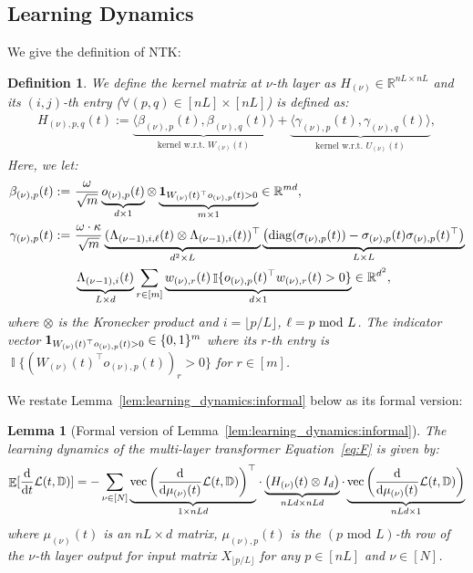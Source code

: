 \documentclass[11pt]{article}
\theoremstyle{plain}
\newtheorem{lemma}[theorem]{Lemma}
\newtheorem{definition}[theorem]{Definition}
\newcommand{\R}{\mathbb{R}}
\renewcommand{\d}{\mathrm{d}}
\DeclareMathOperator*{\E}{{\mathbb{E}}}
\DeclareMathOperator{\I}{\mathbb{I}}
\DeclareMathOperator{\diag}{diag}
\DeclareMathOperator{\vect}{vec}
\begin{document}
\subsection{Learning Dynamics}

We give the definition of NTK:
\begin{definition}
    We define the kernel matrix at $\nu$-th layer as $H_{(\nu)} \in \R^{nL \times nL}$ and its $(i, j)$-th entry ($\forall (p, q) \in [nL] \times [nL]$) is defined as:
\begin{align*}
    H_{(\nu), p, q}(t) := \underbrace{\langle \beta_{(\nu), p}(t), \beta_{(\nu), q}(t) \rangle}_{\text{kernel w.r.t. $W_{(\nu)}(t)$}} + \underbrace{\langle \gamma_{(\nu), p}(t), \gamma_{(\nu), q}(t) \rangle}_{\text{kernel w.r.t. $U_{(\nu)}(t)$}},
\end{align*}
Here, we let:
\begin{align*}
    \beta_{(\nu), p}(t) := & ~ \frac{\omega}{\sqrt{m}} \underbrace{o_{(\nu), p}(t)}_{d \times 1} \otimes \underbrace{{\bf 1}_{W_{(\nu)}(t)^\top o_{(\nu), p}(t) > 0}}_{m\times 1} \in \R^{md}, \\
    \gamma_{(\nu), p}(t) := & ~ \frac{\omega \cdot \kappa}{\sqrt{m}} \underbrace{(\Lambda_{(\nu-1), i, \ell}(t) \otimes \Lambda_{(\nu-1), i}(t))^\top}_{d^2 \times L} \underbrace{\left(\diag(\sigma_{(\nu), p}(t)) - \sigma_{(\nu), p}(t)\sigma_{(\nu), p}(t)^\top\right)}_{L\times L} \\
    & ~ \underbrace{\Lambda_{(\nu-1), i }(t)}_{L \times d} \sum_{r\in [m]} \underbrace{ w_{(\nu), r}(t) \I\{ o_{(\nu), p}(t)^\top w_{(\nu), r}(t) > 0\}}_{d \times 1} \in \R^{d^2},
\end{align*}
where $\otimes $ is the Kronecker product and $i = \lfloor p / L \rfloor$, $\ell = p {~ \rm mod~}L$. The indicator vector ${\bf 1}_{W_{(\nu)}(t)^\top o_{(\nu), p}(t) > 0} \in \{0, 1\}^{m}$ where its $r$-th entry is $\I\{ \left(W_{(\nu)}(t)^\top o_{(\nu), p}(t) \right)_r > 0\}$ for $r \in [m]$.
\end{definition}

We restate Lemma~\ref{lem:learning_dynamics:informal} below as its formal version:
\begin{lemma}[Formal version of Lemma~\ref{lem:learning_dynamics:informal}]\label{lem:learning_dynamics}
    The learning dynamics of the multi-layer transformer Equation~\eqref{eq:F} is given by:
    \begin{align*}
        \E[\frac{\d }{\d t}{\cal L}(t, \mathbb{D})] = - \sum_{\nu \in [N]} {\underbrace{\vect\left(\frac{\d }{\d \mu_{(\nu)}(t)}{\cal L}(t, \mathbb{D}) \right)^\top}_{1 \times nLd}} \cdot \underbrace{\left( H_{(\nu)}(t) \otimes I_d \right)}_{nLd \times nLd} \cdot  \underbrace{\vect\left(\frac{\d }{\d \mu_{(\nu)}(t)}{\cal L}(t, \mathbb{D}) \right)}_{nLd \times 1}
    \end{align*}
    where $\mu_{(\nu)}(t)$ is an $nL \times d$ matrix, $\mu_{(\nu), p}(t)$ is the $(p\text{ mod } L)$-th row of the $\nu$-th layer output for input matrix $X_{\lfloor p / L \rfloor}$ for any $p \in [nL]$ and $\nu \in [N]$.
\end{lemma}
\end{document}

